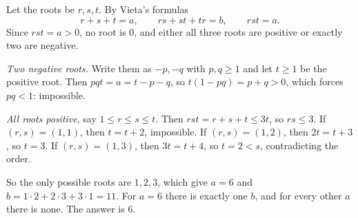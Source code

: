 Let the roots be $r,s,t$. By Vieta's formulas
\[
r+s+t=a,\qquad rs+st+tr=b,\qquad rst=a .
\]
Since $rst=a>0$, no root is $0$, and either all three roots are positive or exactly two are negative.

\emph{Two negative roots.} Write them as $-p,-q$ with $p,q\ge1$ and let $t\ge1$ be the positive root. Then $pqt=a=t-p-q$, so $t(1-pq)=p+q>0$, which forces $pq<1$: impossible.

\emph{All roots positive}, say $1\le r\le s\le t$. Then $rst=r+s+t\le3t$, so $rs\le3$. If $(r,s)=(1,1)$, then $t=t+2$, impossible. If $(r,s)=(1,2)$, then $2t=t+3$, so $t=3$. If $(r,s)=(1,3)$, then $3t=t+4$, so $t=2<s$, contradicting the order.

So the only possible roots are $1,2,3$, which give $a=6$ and $b=1\cdot2+2\cdot3+3\cdot1=11$. For $a=6$ there is exactly one $b$, and for every other $a$ there is none. The answer is $\boxed{6}$.
